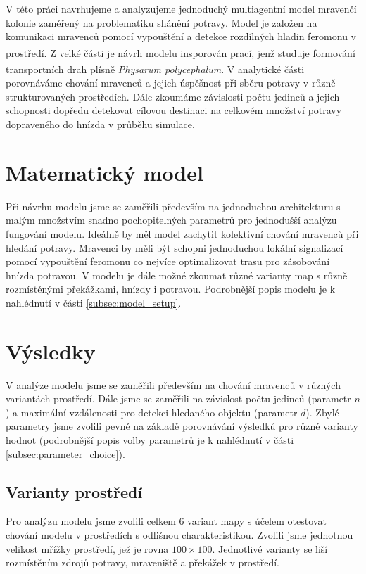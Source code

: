 \documentclass[10pt,a4paper,twocolumn]{article}
\begin{document}
V této práci navrhujeme a analyzujeme jednoduchý multiagentní model mravenčí 
kolonie zaměřený na problematiku shánění potravy. Model je založen na komunikaci
mravenců pomocí vypouštění a detekce rozdílných hladin feromonu v prostředí.
Z velké části je návrh modelu insporován 
prací\textsuperscript{\cite{jones2010characteristics}}, 
jenž studuje
formování transportních drah plísně 
\emph{Physarum polycephalum}\textsuperscript{\cite{durham1976control}}. 
V analytické části
porovnáváme chování mravenců a jejich úspěšnost při sběru potravy v různě 
strukturovaných prostředích. Dále zkoumáme závislosti počtu jedinců a jejich 
schopnosti dopředu detekovat cílovou destinaci na celkovém množství potravy 
dopraveného do hnízda v průběhu simulace. 


\section{Matematický model}
Při návrhu modelu jsme se zaměřili především na jednoduchou architekturu s
malým množstvím snadno pochopitelných parametrů pro jednodušší analýzu 
fungování modelu.
Ideálně by měl model zachytit kolektivní chování mravenců při hledání potravy.
Mravenci by měli být schopni jednoduchou lokální signalizací pomocí
vypouštění feromonu co nejvíce optimalizovat trasu pro zásobování hnízda
potravou. V modelu je dále možné zkoumat různé varianty map s různě 
rozmístěnými překážkami, hnízdy i potravou. Podrobnější popis modelu
je k nahlédnutí v části \ref{subsec:model_setup}.

\section{Výsledky}

V analýze modelu jsme se zaměřili především na chování mravenců v různých
variantách prostředí. Dále jsme se zaměřili na závislost počtu
jedinců (parametr $n$) a maximální vzdálenosti pro detekci hledaného 
objektu (parametr $d$). Zbylé parametry jsme zvolili pevně na základě
porovnávání výsledků pro různé varianty hodnot (podrobnější popis 
volby parametrů je k nahlédnutí v části \ref{subsec:parameter_choice}).

\subsection{Varianty prostředí}
\label{subsec:map_variants}
Pro analýzu modelu jsme zvolili celkem 6 variant mapy s účelem otestovat
chování modelu v prostředích s odlišnou charakteristikou. Zvolili jsme 
jednotnou velikost mřížky prostředí, jež je rovna $100 \times 100$.
Jednotlivé varianty se liší rozmístěním zdrojů potravy, mraveniště a překážek
v prostředí.
\end{document}
